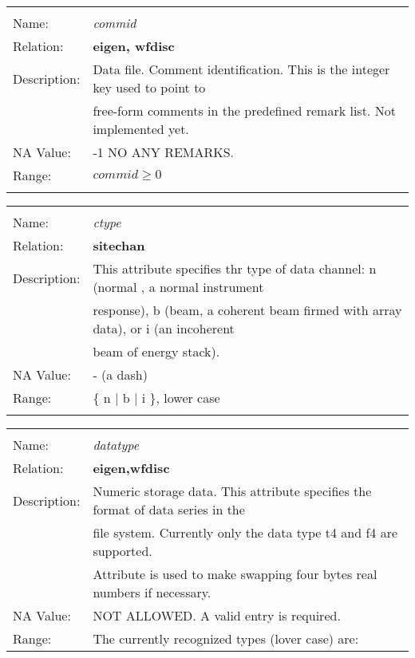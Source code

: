 \begin{tabular*}{6.5 in}{ll} \hline
\\
Name: & {\it commid} \\
Relation: & {\bf eigen, wfdisc} \\
Description: & Data file. Comment identification. This is the integer key used to point to \\
& free-form comments in the predefined remark list. Not implemented yet. \\
NA Value: & -1 NO ANY REMARKS. \\
Range: & $ commid \geq 0$ \\
&\\
\end{tabular*}
\begin{tabular*}{6.5 in}{ll} \hline
\\
Name: & {\it ctype } \\
Relation: & {\bf sitechan} \\
Description: & This attribute specifies thr type of data channel: n (normal , a normal instrument \\
& response), b (beam, a coherent beam firmed with array data), or i (an incoherent \\
& beam of energy stack). \\
NA Value: & - (a dash) \\
Range: & \{ n $|$ b $|$ i \}, lower case \\
&\\
\end{tabular*}
\begin{tabular*}{6.5 in}{ll} \hline
\\
Name: & {\it datatype} \\
Relation: & {\bf eigen,wfdisc} \\
Description: & Numeric storage data. This attribute specifies the format of data series in the \\
& file system. Currently only the data type t4 and f4 are supported. \\
 & Attribute is used to make swapping four bytes real numbers if necessary. \\
NA Value: & NOT ALLOWED. A valid entry is required. \\
Range: & The currently recognized types (lover case) are:
\end{tabular*}

